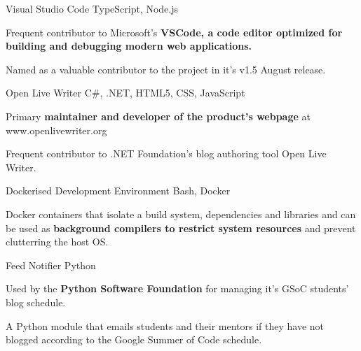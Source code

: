 
\begin{projentries}

\projentry%
  {Visual Studio Code} %
  {TypeScript, Node.js} %
  {} %
  {%
    \begin{projitems} %
      \item{Frequent contributor to Microsoft's \textbf{VSCode, a code editor
            optimized for building and debugging modern web applications.}}
      \item{Named as a valuable contributor to the project in it's v1.5 August
            release.}
    \end{projitems}
  }

\projentry%
  {Open Live Writer} %
  {C\#, .NET, HTML5, CSS, JavaScript} %
  {} %
  {%
    \begin{projitems} %
      \item{Primary \textbf{maintainer and developer of the product's webpage}
            at www.openlivewriter.org}
      \item{Frequent contributor to .NET Foundation’s blog authoring tool Open
            Live Writer.}
    \end{projitems}
  }

\projentry%
  {Dockerised Development Environment} %
  {Bash, Docker} %
  {} %
  {%
    \begin{projitems}
      \item{Docker containers that isolate a build system, dependencies and
            libraries and can be used as \textbf{background compilers to
            restrict system resources} and prevent clutterring the host OS.}
    \end{projitems}
  }

\projentry%
  {Feed Notifier} %
  {Python} %
  {} %
  {%
    \begin{projitems} %
      \item{Used by the \textbf{Python Software Foundation} for managing it's
            GSoC students' blog schedule.}
      \item{A Python module that emails students and their mentors if they
            have not blogged according to the Google Summer of Code schedule.}
    \end{projitems}
  }


\end{projentries}
